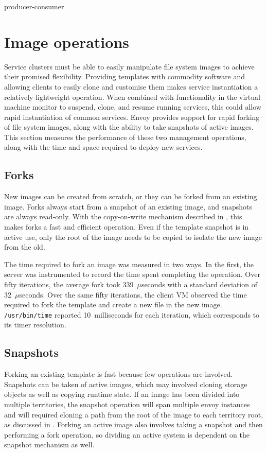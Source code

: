 producer-consumer

\section{Image operations}\label{sec:image-operations}

Service clusters must be able to easily manipulate file system images to achieve their promised flexibility. Providing templates with commodity software and allowing clients to easily clone and customise them makes service instantiation a relatively lightweight operation. When combined with functionality in the virtual machine monitor to suspend, clone, and resume running services, this could allow rapid instantiation of common services. Envoy provides support for rapid forking of file system images, along with the ability to take snapshots of active images. This section measures the performance of these two management operations, along with the time and space required to deploy new services.

\subsection{Forks}

New images can be created from scratch, or they can be forked from an existing image. Forks always start from a snapshot of an existing image, and snapshots are always read-only. With the copy-on-write mechanism described in , this makes forks a fast and efficient operation. Even if the template snapshot is in active use, only the root of the image needs to be copied to isolate the new image from the old.

The time required to fork an image was measured in two ways. In the first, the server was instrumented to record the time spent completing the operation. Over fifty iterations, the average fork took 339~$\mu$seconds with a standard deviation of 32~$\mu$seconds. Over the same fifty iterations, the client VM observed the time required to fork the template and create a new file in the new image. \texttt{/usr/bin/time} reported 10~milliseconds for each iteration, which corresponds to its timer resolution.

\subsection{Snapshots}

Forking an existing template is fast because few operations are involved. Snapshots can be taken of active images, which may involved cloning storage objects as well as copying runtime state. If an image has been divided into multiple territories, the snapshot operation will span multiple envoy instances and will required cloning a path from the root of the image to each territory root, as discussed in . Forking an active image also involves taking a snapshot and then performing a fork operation, so dividing an active system is dependent on the snapshot mechanism as well.


